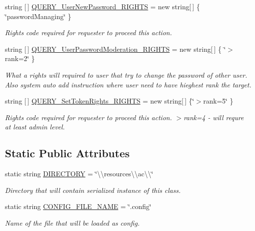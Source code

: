 \begin{DoxyCompactItemize}
string \mbox{[}$\,$\mbox{]} \mbox{\hyperlink{class_authority_controller_1_1_data_1_1_application_1_1_config_a93960243b140fa132aef425493c7bb70}{Q\+U\+E\+R\+Y\+\_\+\+User\+New\+Password\+\_\+\+R\+I\+G\+H\+TS}} = new string\mbox{[}$\,$\mbox{]} \{ \char`\"{}password\+Managing\char`\"{} \}
\begin{DoxyCompactList}\small\item\em Rights code required for requester to proceed this action. \end{DoxyCompactList}\item 
string \mbox{[}$\,$\mbox{]} \mbox{\hyperlink{class_authority_controller_1_1_data_1_1_application_1_1_config_acf5f9058d36f7fd7fb017098481f8dfc}{Q\+U\+E\+R\+Y\+\_\+\+User\+Password\+Moderation\+\_\+\+R\+I\+G\+H\+TS}} = new string\mbox{[}$\,$\mbox{]} \{ \char`\"{}$>$rank=2\char`\"{} \}
\begin{DoxyCompactList}\small\item\em What a rights will required to user that try to change the password of other user. Also system auto add instruction where user need to have hieghest rank the target. \end{DoxyCompactList}\item 
string \mbox{[}$\,$\mbox{]} \mbox{\hyperlink{class_authority_controller_1_1_data_1_1_application_1_1_config_a0ac15c9d4920092355022d3cc0d47f4d}{Q\+U\+E\+R\+Y\+\_\+\+Set\+Token\+Rights\+\_\+\+R\+I\+G\+H\+TS}} = new string\mbox{[}$\,$\mbox{]} \{\char`\"{}$>$rank=5\char`\"{} \}
\begin{DoxyCompactList}\small\item\em Rights code required for requester to proceed this action. $>$rank=4 -\/ will requre at least admin level. \end{DoxyCompactList}\end{DoxyCompactItemize}
\subsection*{Static Public Attributes}
\begin{DoxyCompactItemize}
\item 
static string \mbox{\hyperlink{class_authority_controller_1_1_data_1_1_application_1_1_config_ad3be522aa76fea2a368ffa3810979012}{D\+I\+R\+E\+C\+T\+O\+RY}} = \char`\"{}\textbackslash{}\textbackslash{}resources\textbackslash{}\textbackslash{}ac\textbackslash{}\textbackslash{}\char`\"{}
\begin{DoxyCompactList}\small\item\em Directory that will contain serialized instance of this class. \end{DoxyCompactList}\item 
static string \mbox{\hyperlink{class_authority_controller_1_1_data_1_1_application_1_1_config_a7cc94e6fe35ce997e75f0a0fa3feaa2e}{C\+O\+N\+F\+I\+G\+\_\+\+F\+I\+L\+E\+\_\+\+N\+A\+ME}} = \char`\"{}.config\char`\"{}
\begin{DoxyCompactList}\small\item\em Name of the file that will be loaded as config. \end{DoxyCompactList}\end{DoxyCompactItemize}
